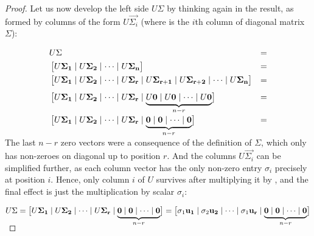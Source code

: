 \begin{proof}
Let us now develop the left side $U \Sigma$ by thinking again in the
result, as formed by columns of the form $U \vec{\Sigma_i}$ (where
   is the $i$th column of diagonal matrix $\Sigma$): 

\begin{align*}
  & U \Sigma &= \\
  & \begin{bmatrix}
      U\vec{\Sigma_1} \mid U\vec{\Sigma_2} \mid \cdots \mid U\vec{\Sigma_n} 
    \end{bmatrix} &= \\
  & \begin{bmatrix}
      U\vec{\Sigma_1} \mid U\vec{\Sigma_2} \mid \cdots \mid U\vec{\Sigma_r} \mid
      U\vec{\Sigma_{r+1}} \mid U\vec{\Sigma_{r+2}} \mid \cdots \mid U\vec{\Sigma_{n}} 
    \end{bmatrix} &= \\[1ex]
  & \begin{bmatrix}
      U\vec{\Sigma_1} \mid U\vec{\Sigma_2} \mid \cdots \mid U\vec{\Sigma_r} \mid
      \smash{\underbrace{U\vec{0} \mid U\vec{0} \mid \cdots
          \mid U\vec{0}}_{n - r}}
    \end{bmatrix} &= \\[2.5ex]
  & \begin{bmatrix}
      U\vec{\Sigma_1} \mid U\vec{\Sigma_2} \mid \cdots \mid U\vec{\Sigma_r} \mid
      \smash{\underbrace{\vec{0} \mid \vec{0} \mid \cdots \mid \vec{0}}_{n-r}} 
    \end{bmatrix} &= \\[0.5ex]
\end{align*}

The last $n - r$ zero vectors were a consequence of the definition of
$\Sigma$, which only has non-zeroes on diagonal up to position
$r$. And the columns $U\vec{\Sigma_i}$ can be simplified further, as
each column vector  has the only non-zero entry
$\sigma_i$ precisely at position $i$. Hence, only column $i$ of $U$
survives after multiplying it by , and the final effect
is just the multiplication by scalar $\sigma_i$:

\[
 U \Sigma = 
\begin{bmatrix}
   U\vec{\Sigma_1} \mid U\vec{\Sigma_2} \mid \cdots \mid U\vec{\Sigma_r} \mid
   \smash{\underbrace{\vec{0} \mid \vec{0} \mid \cdots \mid \vec{0}}_{n-r}}
\end{bmatrix} = 
\begin{bmatrix}
   \sigma_1\vec{u_1} \mid \sigma_2\vec{u_2} \mid \cdots \mid \sigma_1\vec{u_r} \mid
   \smash{\underbrace{\vec{0} \mid \vec{0} \mid \cdots \mid \vec{0}}_{n-r}}
\end{bmatrix}
\]
\hfill


\end{proof}
